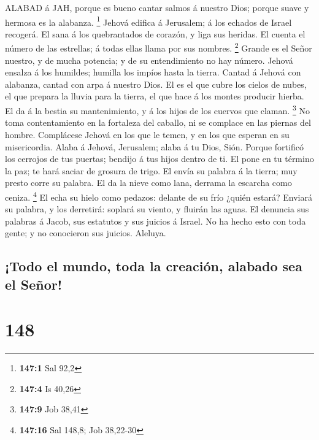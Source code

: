  ALABAD á JAH, porque es bueno cantar salmos á nuestro Dios;
porque suave y hermosa es la alabanza. \footnote{\textbf{147:1} Sal 92,2}
 Jehová edifica á Jerusalem; á los echados de Israel
recogerá.  El sana á los quebrantados de corazón, y liga sus
heridas.  El cuenta el número de las estrellas; á todas
ellas llama por sus nombres. \footnote{\textbf{147:4} Is 40,26}
 Grande es el Señor nuestro, y de mucha potencia; y de su
entendimiento no hay número.  Jehová ensalza á los humildes;
humilla los impíos hasta la tierra.  Cantad á Jehová con
alabanza, cantad con arpa á nuestro Dios.  El es el que
cubre los cielos de nubes, el que prepara la lluvia para la tierra, el
que hace á los montes producir hierba.  El da á la bestia su
mantenimiento, y á los hijos de los cuervos que claman. \footnote{\textbf{147:9}
  Job 38,41}  No toma contentamiento en la fortaleza del
caballo, ni se complace en las piernas del hombre. 
Complácese Jehová en los que le temen, y en los que esperan en su
misericordia.  Alaba á Jehová, Jerusalem; alaba á tu Dios,
Sión.  Porque fortificó los cerrojos de tus puertas;
bendijo á tus hijos dentro de ti.  El pone en tu término la
paz; te hará saciar de grosura de trigo.  El envía su
palabra á la tierra; muy presto corre su palabra.  El da la
nieve como lana, derrama la escarcha como ceniza. \footnote{\textbf{147:16}
  Sal 148,8; Job 38,22-30}  El echa su hielo como pedazos:
delante de su frío ¿quién estará?  Enviará su palabra, y
los derretirá: soplará su viento, y fluirán las aguas.  El
denuncia sus palabras á Jacob, sus estatutos y sus juicios á Israel.
 No ha hecho esto con toda gente; y no conocieron sus
juicios. Aleluya.

\hypertarget{todo-el-mundo-toda-la-creaciuxf3n-alabado-sea-el-seuxf1or}{%
\subsection{¡Todo el mundo, toda la creación, alabado sea el
Señor!}\label{todo-el-mundo-toda-la-creaciuxf3n-alabado-sea-el-seuxf1or}}

\hypertarget{section-147}{%
\section{148}\label{section-147}}

